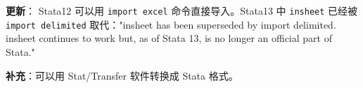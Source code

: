 \documentclass{article}
\begin{document}
\textbf{更新}：
Stata12 可以用 \lstinline{import excel} 命令直接导入。Stata13 中 \lstinline{insheet} 已经被 \lstinline{import delimited} 取代："insheet has been superseded by import delimited.  insheet continues to work but, as of Stata 13, is no longer an official part of Stata."

\textbf{补充}：可以用 Stat/Transfer 软件转换成 Stata 格式。
\end{document}

